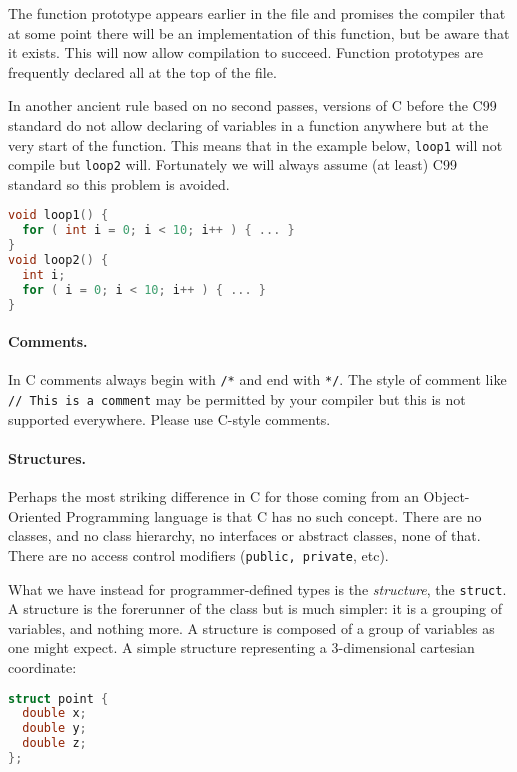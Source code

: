 The function prototype appears earlier in the file and promises the compiler that at some point there will be an implementation of this function, but be aware that it exists. This will now allow compilation to succeed. Function prototypes are frequently declared all at the top of the file.

In another ancient rule based on no second passes, versions of C before the C99 standard do not allow declaring of variables in a function anywhere but at the very start of the function. This means that in the example below, \texttt{loop1} will not compile but \texttt{loop2} will.  Fortunately we will always assume (at least) C99 standard so this problem is avoided.

\begin{lstlisting}[language=C]
void loop1() {
  for ( int i = 0; i < 10; i++ ) { ... }
}
void loop2() {
  int i;
  for ( i = 0; i < 10; i++ ) { ... }
}
\end{lstlisting}

\paragraph{Comments.} In C comments always begin with \texttt{/*} and end with \texttt{*/}. The style of comment like \texttt{// This is a comment} may be permitted by your compiler but this is not supported everywhere. Please use C-style comments.

\paragraph{Structures.} Perhaps the most striking difference in C for those coming from an Object-Oriented Programming language is that C has no such concept. There are no classes, and no class hierarchy, no interfaces or abstract classes, none of that. There are no access control modifiers (\texttt{public, private}, etc).

What we have instead for programmer-defined types is the \textit{structure}, the \texttt{struct}. A structure is the forerunner of the class but is much simpler: it is a grouping of variables, and nothing more. A structure is composed of a group of variables as one might expect. A simple structure representing a 3-dimensional cartesian coordinate:

\begin{lstlisting}[language=C]
struct point {
  double x;
  double y;
  double z;
};
\end{lstlisting}

